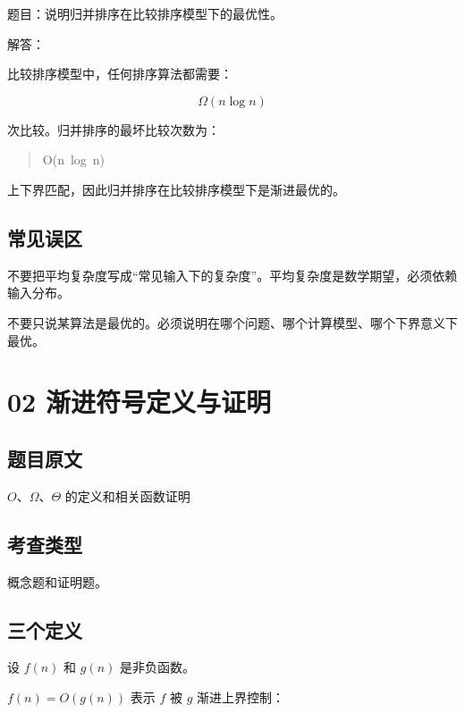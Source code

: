 \documentclass[UTF8,zihao=-4]{ctexart}
\begin{document}
题目：说明归并排序在比较排序模型下的最优性。

解答：

比较排序模型中，任何排序算法都需要：

\[\Omega(n \log n)\]

次比较。归并排序的最坏比较次数为：

\begin{quote}
\small\ttfamily\raggedright
\relax O(n\ log\ n)\\
\end{quote}

上下界匹配，因此归并排序在比较排序模型下是渐进最优的。

\subsection*{常见误区}

不要把平均复杂度写成“常见输入下的复杂度”。平均复杂度是数学期望，必须依赖输入分布。

不要只说某算法是最优的。必须说明在哪个问题、哪个计算模型、哪个下界意义下最优。

\newpage

\section*{02 渐进符号定义与证明}

\subsection*{题目原文}

$O$、$\Omega$、$\Theta$ 的定义和相关函数证明

\subsection*{考查类型}

概念题和证明题。

\subsection*{三个定义}

设 $f(n)$ 和 $g(n)$ 是非负函数。

$f(n) = O(g(n))$ 表示 $f$ 被 $g$ 渐进上界控制：
\end{document}
